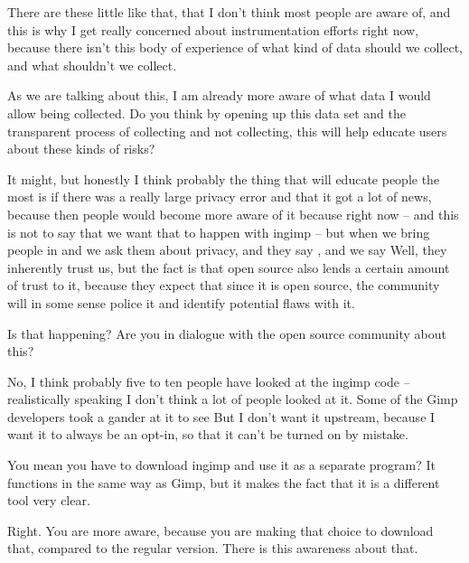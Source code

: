 {There are these little  like that, that I don't think most
people are aware of, and this is why I get really concerned about
instrumentation efforts right now, because there isn't this body of
experience of what kind of data should we collect, and what shouldn't
we collect.\par

 As we are talking about this, I am already more aware of what data
I would allow being collected. Do you think by opening up this data set
and the transparent process of collecting and not collecting, this will
help educate users about these kinds of risks?\par

 It might, but honestly I think probably the thing that will
educate people the most is if there was a really large privacy error
and that it got a lot of news, because then people would become more
aware of it because right now {--} and this is not to say that we want
that to happen with ingimp {--} but when we bring people in and we ask
them about privacy,  and they say
, and we say  Well, they inherently trust us, but the fact is
that open source also lends a certain amount of trust to it, because
they expect that since it is open source, the community will in some
sense police it and identify potential flaws with it.\par

 Is that happening? Are you in dialogue with the open source
community about this?\par

 No, I think probably five to ten people have looked at the ingimp
code {--} realistically speaking I don't think a lot of people looked
at it. Some of the Gimp developers took a gander at it to see  But I don't want it upstream, because I
want it to always be an opt{}-in, so that it can't be turned on by
mistake.\par 

 You mean you have to download ingimp and use it as a separate
program? It functions in the same way as Gimp, but it makes the fact
that it is a different tool very clear.\par

 Right. You are more aware, because you are making that choice to
download that, compared to the regular version. There is this awareness
about that.\par 

}
